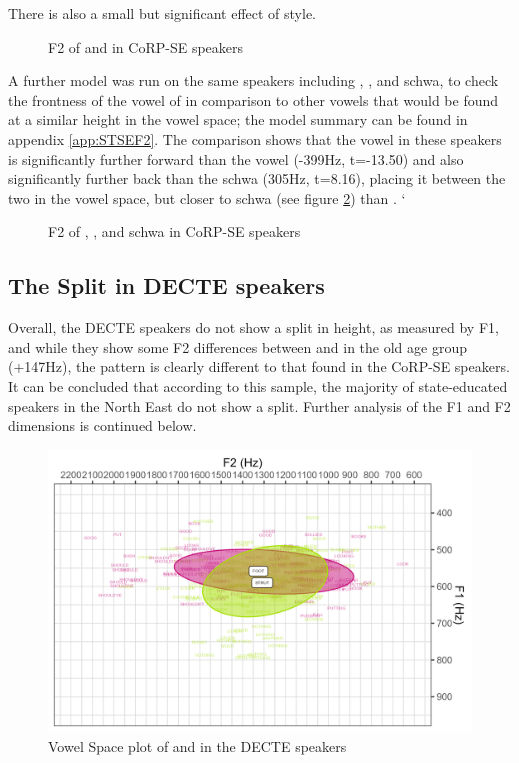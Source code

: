 \documentclass[../../../00.FullDoc/tex/ThesisSkeleton-draft2]{subfiles}
\begin{document}
There is also a small but significant effect of style.



\begin{figure}[h]
	
	\caption{F2 of \foot{} and \strutt{} in CoRP-SE speakers} \label{fig:FSF2SE}
\end{figure}

A further model was run on the same speakers including \strutt{}, , and schwa, to check the frontness of the \strutt{} vowel of in comparison to other vowels that would be found at a similar height in the vowel space; the model summary can be found in appendix \ref{app:STSEF2}. The comparison shows that the \strutt{} vowel in these speakers is significantly further forward than the  vowel (-399Hz, t=-13.50) and also significantly further back than the schwa (305Hz, t=8.16), placing it between the two in the vowel space, but closer to schwa (see figure \ref{fig:STF2SE}) than .
`
\begin{figure}[h]
	
	\caption{F2 of \strutt{}, , and schwa in CoRP-SE speakers} \label{fig:STF2SE}
\end{figure}



\subsection{The  Split in DECTE speakers}
Overall, the DECTE speakers do not show a split in height, as measured by F1, and while they show some F2 differences between \foot{} and \strutt{} in the old age group (+147Hz), the pattern is clearly different to that found in the CoRP-SE speakers. It can be concluded that according to this sample, the majority of state-educated speakers in the North East do not show a \FS{} split. Further analysis of the F1 and F2 dimensions is continued below.

\begin{figure}[h]
	\centering
	\includegraphics[width=\textwidth]{../figures/FS-DE-vplot.png}
	\caption{Vowel Space plot of \foot{} and \strutt{} in the DECTE speakers} \label{fig:FSvplotDE}
\end{figure}
\end{document}
